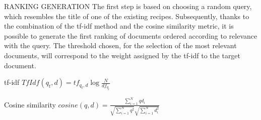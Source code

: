 \begin{frame}{RANKING GENERATION}
    \renewcommand{\thefootnote}{\fnsymbol{footnote}}
    The first step is based on choosing a random query\footnotemark[1], which resembles the title of one of the existing recipes. Subsequently, thanks to the combination of the tf-idf method and the cosine similarity metric, it is possible to generate the first ranking of documents ordered according to relevance with the query. The threshold chosen, for the selection of the most relevant documents, will correspond to the weight assigned by the tf-idf to the target document.
    \begin{minipage}{\linewidth}
        \centering
        \begin{minipage}{0.45\linewidth}
            \begin{block}{\centering tf-idf}
                \centering \small $ TfIdf(q_t,d) = tf_{q_t,d} \log\frac{N}{df_{q_t}}$
            \end{block}
        \end{minipage}
        \hspace{0.05\linewidth}
        \begin{minipage}{0.45\linewidth}
            \begin{block}{\centering Cosine similarity}
                \centering \small $ cosine(q,d) = \frac{\sum_{i=1}^Nqd_i}{\sqrt{\sum_{i=1}^Nq^2}\sqrt{\sum_{i=1}^Nd_i^2}} $
            \end{block}
        \end{minipage}
    \end{minipage}
\end{frame}

